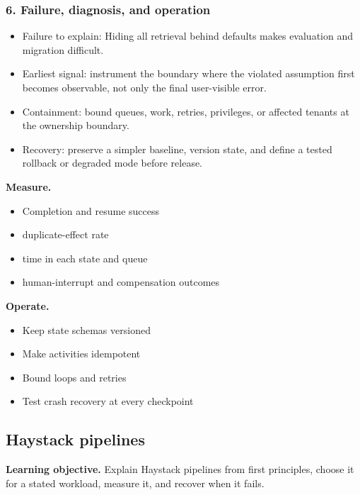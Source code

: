 \subsubsection*{6. Failure, diagnosis, and operation}
\begin{itemize}
\item Failure to explain: Hiding all retrieval behind defaults makes evaluation and migration difficult.
\item Earliest signal: instrument the boundary where the violated assumption first becomes observable, not only the final user-visible error.
\item Containment: bound queues, work, retries, privileges, or affected tenants at the ownership boundary.
\item Recovery: preserve a simpler baseline, version state, and define a tested rollback or degraded mode before release.
\end{itemize}
\textbf{Measure.}\begin{itemize}
\item Completion and resume success
\item duplicate-effect rate
\item time in each state and queue
\item human-interrupt and compensation outcomes
\end{itemize}
\textbf{Operate.}\begin{itemize}
\item Keep state schemas versioned
\item Make activities idempotent
\item Bound loops and retries
\item Test crash recovery at every checkpoint
\end{itemize}
\subsection{Haystack pipelines}
\textbf{Learning objective.} Explain Haystack pipelines from first principles, choose it for a stated workload, measure it, and recover when it fails.
